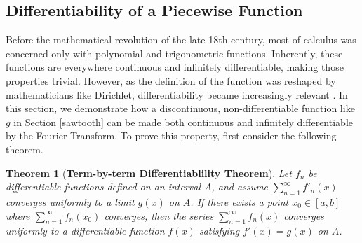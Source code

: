 \documentclass[11pt]{amsart}
\theoremstyle{plain}
\newtheorem{theorem}{Theorem}[section]
\theoremstyle{definition}
\begin{document}
\subsection{Differentiability of a Piecewise Function}
 Before the mathematical revolution of the late 18th century, most of calculus was concerned only with polynomial and trigonometric functions. Inherently, these functions are everywhere continuous and infinitely differentiable, making those properties trivial. However, as the definition of the function was reshaped by mathematicians like Dirichlet, differentiability became increasingly relevant \cite{Abbott}. In this section, we demonstrate how a discontinuous, non-differentiable function like $g$ in Section \ref{sawtooth} can be made both continuous and infinitely differentiable by the Fourier Transform. To prove this property, first consider the following theorem. 
\begin{theorem}[\textbf{Term-by-term Differentiablility Theorem}] \cite{Abbott}\label{thm:diff}
    Let $f_n$ be differentiable functions defined on an interval $A$, and assume $\sum_{n=1}^\infty f'_n(x)$ converges uniformly to a limit $g(x)$ on $A$. If there exists a point $x_0\in [a,b]$ where $\sum_{n=1}^\infty f_n(x_0)$ converges, then the series $\sum_{n=1}^\infty f_n(x)$ converges uniformly to a differentiable function $f(x)$ satisfying $f'(x)=g(x)$ on $A$.
\end{theorem}
\end{document}
